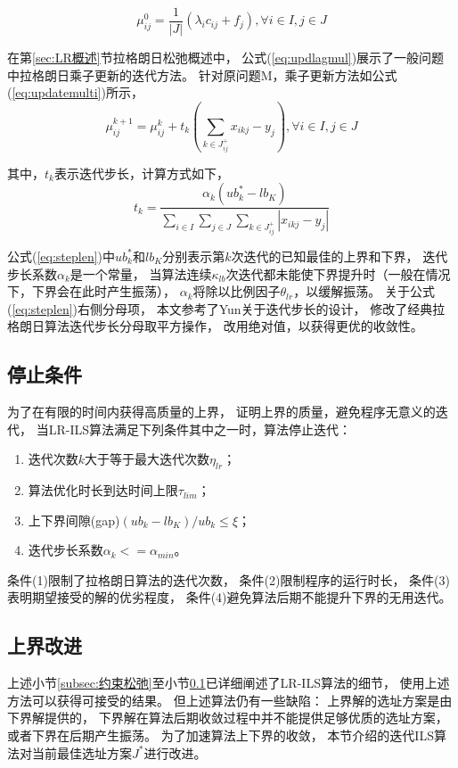 \begin{equation}
    \mu_{ij}^0 = \frac{1}{|J|}(\lambda_i c_{ij} + f_j), \forall i \in I, j\in J
\end{equation}

在第\ref{sec:LR概述}节拉格朗日松弛概述中，
公式(\ref{eq:updlagmul})展示了一般问题中拉格朗日乘子更新的迭代方法。
针对原问题M，乘子更新方法如公式(\ref{eq:updatemulti})所示，
\begin{equation}
\mu^{k+1}_{ij} = \mu^{k}_{ij} + t_k(\sum_{k\in J_{ij}^+}x_{ikj} -y_j),\forall i\in I,j\in J
\label{eq:updatemulti}
\end{equation}

其中，$t_k$表示迭代步长，计算方式如下，
\begin{equation}
t_k = \frac{\alpha_k(ub_k^* - lb_K)} {\sum_{i\in I}\sum_{j\in J}\sum_{k\in J_{ij}^+}|x_{ikj} -y_j|}
\label{eq:steplen}
\end{equation}

公式(\ref{eq:steplen})中$ub_k^*$和$lb_K$分别表示第$k$次迭代的已知最佳的上界和下界，
迭代步长系数$\alpha_k$是一个常量，
当算法连续$\kappa_{lb}$次迭代都未能使下界提升时（一般在情况下，下界会在此时产生振荡），
$\alpha_k$将除以比例因子$\theta_{lr}$，以缓解振荡。
关于公式(\ref{eq:steplen})右侧分母项，
本文参考了Yun\cite{YUN2020}关于迭代步长的设计，
修改了经典拉格朗日算法迭代步长分母取平方操作，
改用绝对值，以获得更优的收敛性。

\subsection{停止条件}
\label{subsec:停止条件}
为了在有限的时间内获得高质量的上界，
证明上界的质量，避免程序无意义的迭代，
当LR-ILS算法满足下列条件其中之一时，算法停止迭代：

\begin{enumerate}[label=(\arabic*),leftmargin=0pt,itemindent=3.5\ccwd, nosep]
    \item 迭代次数$k$大于等于最大迭代次数$\eta_{lr}$；
    \item 算法优化时长到达时间上限$\tau_{lim}$；
    \item 上下界间隙(gap)$(ub_k-lb_K)/ub_k \le \xi$；
    \item 迭代步长系数$\alpha_k <= \alpha_{min}$。
\end{enumerate}

条件(1)限制了拉格朗日算法的迭代次数，
条件(2)限制程序的运行时长，
条件(3)表明期望接受的解的优劣程度，
条件(4)避免算法后期不能提升下界的无用迭代。

\subsection{上界改进}
\label{subsec:上界改进}
上述小节\ref{subsec:约束松弛}至小节\ref{subsec:停止条件}已详细阐述了LR-ILS算法的细节，
使用上述方法可以获得可接受的结果\cite{yun2015,Daskin书,Fisher2004}。
但上述算法仍有一些缺陷：
上界解的选址方案是由下界解提供的，
下界解在算法后期收敛过程中并不能提供足够优质的选址方案，
或者下界在后期产生振荡。
为了加速算法上下界的收敛，
本节介绍的迭代ILS算法对当前最佳选址方案$J^*$进行改进。


